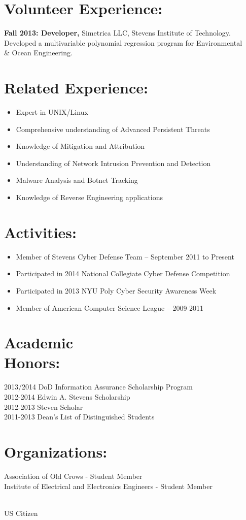 \documentclass[mm]{res}
\begin{document}
\begin{resume}
\section{Volunteer Experience:} 
            {\bf Fall 2013: Developer,} Simetrica LLC, Stevens Institute of Technology.\\       
  Developed a multivariable polynomial regression program for Environmental \\ \& Ocean Engineering.
                
\section{Related Experience:}
\begin{itemize} \itemsep -2pt %
\item Expert in UNIX/Linux
\item Comprehensive understanding of Advanced Persistent Threats
\item Knowledge of Mitigation and Attribution
\item Understanding of Network Intrusion Prevention and Detection
\item Malware Analysis and Botnet Tracking
\item Knowledge of Reverse Engineering applications
\end{itemize}

\section{Activities:}
\begin{itemize} \itemsep -2pt
\item Member of Stevens Cyber Defense Team – September 2011 to Present
\item Participated in 2014 National Collegiate Cyber Defense  Competition
\item Participated in 2013 NYU Poly Cyber Security Awareness Week
\item Member of American Computer Science League – 2009-2011
\end{itemize}

\section{Academic \\ Honors:} 
2013/2014 DoD Information Assurance Scholarship Program \\
2012-2014 Edwin A. Stevens Scholarship  \\
2012-2013 Steven Scholar \\
2011-2013 Dean's List of Distinguished Students

\section{Organizations:}
Association of Old Crows - Student Member \\ 
Institute of Electrical and Electronics Engineers - Student Member\\

\end{resume} 
\centerline{\\ US Citizen}
\end{document}
